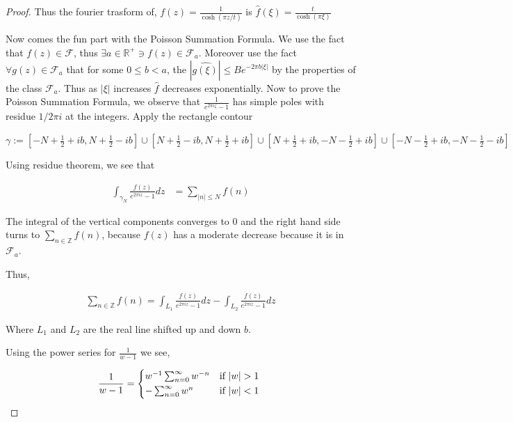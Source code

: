 \documentclass{article}
\newcommand{\R}{\mathbb{R}}
\newcommand{\Z}{\mathbb{Z}}
\newcommand{\abs}[1]{\left\lvert #1\right\rvert}
\begin{document}
\begin{proof}
    Thus the fourier trasform of, $f(z) = \frac{1}{\cosh(\pi z / t)}$ is $\hat{f}(\xi) = \frac{t}{\cosh(\pi \xi)}$ 

    Now comes the fun part with the Poisson Summation Formula. We use the fact that $f(z) \in \mathscr{F}$, thus $\exists a \in \R^+ \ni f(z) \in \mathscr{F}_a$. Moreover use the fact $\forall g(z) \in \mathscr{F}_a$ that for some $0 \leq b < a$, the $\abs{\hat{g(\xi)}} \leq B e^{-2 \pi b \abs{\xi}}$ by the properties of the class $\mathscr{F}_a$. Thus as $\abs{\xi}$ increases $\hat{f}$ decreases exponentially. Now to prove the Poisson Summation Formula, we observe that $\frac{1}{e^{2 \pi i \zeta} - 1}$ has simple poles with residue $1 / 2\pi i$ at the integers. Apply the rectangle contour 
    
    $\gamma := [-N + \frac{1}{2} + ib, N + \frac{1}{2} - ib] \cup [N + \frac{1}{2} - ib , N + \frac{1}{2} + ib] \cup [N  +\frac{1}{2} + ib, -N - \frac{1}{2} + ib] \cup [-N -\frac{1}{2} + ib, -N - \frac{1}{2} - ib]$ 

    Using residue theorem, we see that 

    \begin{align*}
        \int_{\gamma_N} \frac{f(z)}{e^{2 \pi i z} - 1} dz &= \sum_{\abs{n} \leq N} f(n)
    \end{align*}
    
    The integral of the vertical components converges to 0 and the right hand side turns to $\sum_{n \in \Z} f(n)$,  because $f(z)$ has a moderate decrease because it is in $\mathscr{F}_a$. 

    Thus, 

    \begin{align*}
        \sum_{n \in \Z} f(n) = \int_{L_1} \frac{f(z)}{e^{2 \pi i z} - 1} dz - \int_{L_2} \frac{f(z)}{e^{2 \pi i z} - 1} dz
    \end{align*}

    Where $L_1$ and $L_2$ are the real line shifted up and down $b$.    
    
    Using the power series for $\frac{1}{w - 1}$ we see, 
    
    \begin{equation*}
        \frac{1}{w - 1} = \begin{cases*}
            w^{-1} \sum_{n = 0}^{\infty} w^{-n} & \text{if} $|w| > 1$ \\
            - \sum_{n = 0}^{\infty} w^{n} & \text{if} $|w| < 1$
        \end{cases*}
    \end{equation*}


\end{proof}
\end{document}

